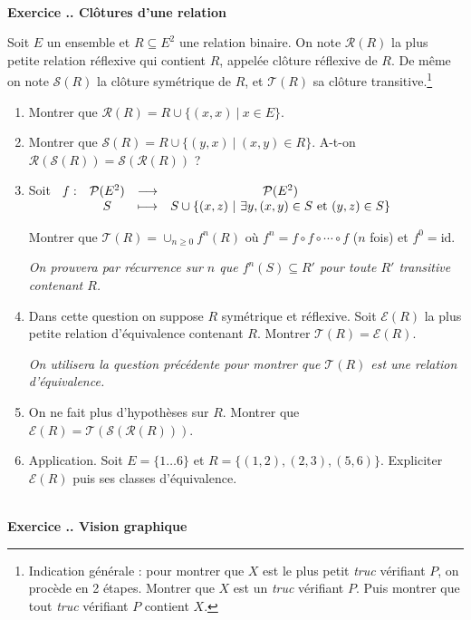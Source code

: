 \documentclass{article}
\newcommand{\fonction}[5]{\raisebox{-0.5\baselineskip}{$\begin{array}{lccc}
    #1: & #2 & \longrightarrow & #3 \\
        & #4 & \longmapsto & #5 \end{array}$}}
\newcommand{\mc}[1]{\mathcal{#1}}
\newcounter{exo}
\newcommand{\exercice}[1][\null]{\textbf{\\ Exercice \thesection.\theexo. #1} \addtocounter{exo}{1}}
\begin{document}
\exercice[Clôtures d'une relation]
 
 Soit $E$ un ensemble et $R \subseteq E^2$ une relation binaire. On note $\mc{R}(R)$ la plus petite relation réflexive qui contient $R$, appelée clôture réflexive de $R$. De même on note $\mc{S}(R)$ la clôture symétrique de $R$, et $\mc{T}(R)$ sa clôture transitive.\footnote{Indication générale : pour montrer que $X$ est le plus petit \emph{truc} vérifiant $P$, on procède en 2 étapes. Montrer que $X$ est un \emph{truc} vérifiant $P$. Puis montrer que tout \emph{truc} vérifiant $P$ contient $X$.}



\begin{enumerate}

\item Montrer que $\mc{R}(R)  = R \cup \{ (x,x) ~|~x\in E\}$.

\item Montrer que $\mc{S}(R)  = R \cup \{ (y,x) ~|~(x,y)\in R\}$. A-t-on $ \mc{R}(\mc{S}(R)) = \mc{S}(\mc{R}(R))$ ?

\item Soit $\fonction{f}{\mc{P}(E^2)}{\mc{P}(E^2)}{S}{S \cup \{(x,z)~|~\exists y, (x,y)\in S \text{ et }(y,z) \in S\}}$

Montrer que $\mc{T}(R) = \cup_{n \ge 0} f^n(R)$ où $f^n = f \circ f \circ \cdots \circ f$ ($n$ fois) et $f^0 = \text{id}$.

\emph{On prouvera par récurrence sur $n$ que $f^n(S) \subseteq R'$ pour toute $R'$ transitive contenant $R$.}

\item Dans cette question on suppose $R$ symétrique et réflexive. Soit $\mc{E}(R)$ la plus petite relation d'équivalence contenant $R$. Montrer $\mc{T}(R) = \mc{E}(R)$.

\emph{On utilisera la question précédente pour montrer que $\mc{T}(R)$ est une relation d'équivalence.}

\item On ne fait plus d'hypothèses sur $R$. Montrer que $\mc{E}(R) = \mc{T} (\mc{S}(\mc{R}(R)))$.

\item Application. Soit $E = \{1 \dots 6\}$ et $R = \{(1,2),(2,3),(5,6)\}$. Expliciter $\mc{E}(R)$ puis ses classes d'équivalence.


\end{enumerate}




\exercice[Vision graphique]
\end{document}
